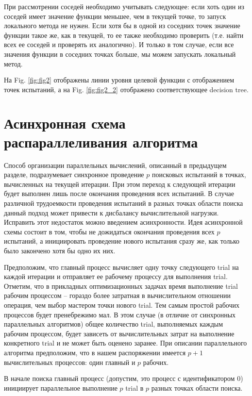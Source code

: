 \documentclass{svproc}
\begin{document}
При рассмотрении соседей необходимо учитывать следующее: если хоть один из соседей имеет значение функции меньшее, чем в текущей точке, то запуск локального метода не нужен. Если хотя бы в одной из соседних точек значение функции такое же, как в текущей, то ее также необходимо проверить (т.е. найти всех ее соседей и проверять их аналогично). И только в том случае, если все значения функции в соседних точках больше, мы можем запускать локальный метод.

На Fig. \ref{fig:fig2} отображены линии уровня целевой функции с отображением точек испытаний, а на Fig. \ref{fig:fig2_2} отображено соответствующее decision tree. 

\section{Асинхронная схема распараллеливания алгоритма}\label{SecASP}

Способ организации параллельных вычислений, описанный в предыдущем разделе, подразумевает синхронное проведение $p$ поисковых испытаний в точках, вычисленных на текущей итерации. При этом переход к следующей итерации будет выполнен лишь после окончания проведения всех испытаний.
В случае различной трудоемкости проведения испытаний в разных точках области поиска данный подход может привести к дисбалансу вычислительной нагрузки. 
Исправить этот недостаток можно введением асинхронности.
Идея асинхронной схемы состоит в том, чтобы не дожидаться окончания проведения всех $p$ испытаний, а инициировать проведение нового испытания сразу же, как только было закончено хотя бы  одно их них. 

Предположим, что главный процесс вычисляет одну точку следующего trial на каждой итерации и отправляет ее рабочему процессу для выполнения trial. Отметим, что в прикладных оптимизационных задачах время выполнение trial рабочим процессом -- гораздо более затратная в вычислительном отношении операция, чем выбор мастером точки нового trial. Тем самым простой рабочих процессов будет пренебрежимо мал. В этом случае (в отличие от синхронных параллельных алгоритмов) общее количество trial, выполняемых каждым рабочим процессом, будет зависеть от вычислительных затрат на выполнение конкретного trial и не может быть оценено заранее. При описании параллельного алгоритма предположим, что в нашем распоряжении имеется $p+1$ вычислительных процессов: один главный и $p$ рабочих.

 В начале поиска главный процесс (допустим, это процесс с идентификатором $0$) инициирует параллельное выполнение $p$ trial в $p$ разных точках области поиска.
\end{document}
